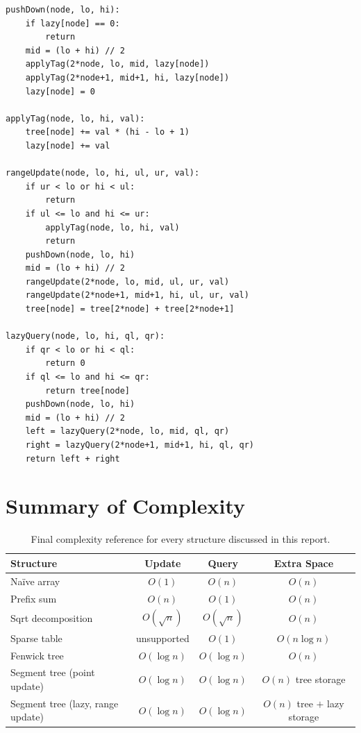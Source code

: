 \documentclass[
  11pt,
  a4paper,
  twoside=false,
  numbers=noenddot,
  headings=big,
  parskip=half,
  toc=bibliography,
  toc=listof,
  bibliography=totoc
]{scrreprt}
\newcommand{\Oh}[1]{O\!\left(#1\right)}
\newcommand{\tblhead}[1]{\textbf{\sffamily #1}}
\begin{document}
\begin{lstlisting}[caption={Lazy-propagation extension for range-add / range-sum (Chapter~\ref{ch:lazy}).}]
pushDown(node, lo, hi):
    if lazy[node] == 0:
        return
    mid = (lo + hi) // 2
    applyTag(2*node, lo, mid, lazy[node])
    applyTag(2*node+1, mid+1, hi, lazy[node])
    lazy[node] = 0

applyTag(node, lo, hi, val):
    tree[node] += val * (hi - lo + 1)
    lazy[node] += val

rangeUpdate(node, lo, hi, ul, ur, val):
    if ur < lo or hi < ul:
        return
    if ul <= lo and hi <= ur:
        applyTag(node, lo, hi, val)
        return
    pushDown(node, lo, hi)
    mid = (lo + hi) // 2
    rangeUpdate(2*node, lo, mid, ul, ur, val)
    rangeUpdate(2*node+1, mid+1, hi, ul, ur, val)
    tree[node] = tree[2*node] + tree[2*node+1]

lazyQuery(node, lo, hi, ql, qr):
    if qr < lo or hi < ql:
        return 0
    if ql <= lo and hi <= qr:
        return tree[node]
    pushDown(node, lo, hi)
    mid = (lo + hi) // 2
    left = lazyQuery(2*node, lo, mid, ql, qr)
    right = lazyQuery(2*node+1, mid+1, hi, ql, qr)
    return left + right
\end{lstlisting}

\chapter{Summary of Complexity}

\begin{table}[H]
\centering
\caption{Final complexity reference for every structure discussed in this report.}
\label{tab:final-complexity}
\begin{tabular}{lccc}
\toprule
\tblhead{Structure} & \tblhead{Update} & \tblhead{Query} & \tblhead{Extra Space} \\
\midrule
Na\"ive array       & $\Oh{1}$       & $\Oh{n}$       & $\Oh{n}$ \\
Prefix sum          & $\Oh{n}$       & $\Oh{1}$       & $\Oh{n}$ \\
Sqrt decomposition   & $\Oh{\sqrt n}$ & $\Oh{\sqrt n}$ & $\Oh{n}$ \\
Sparse table         & unsupported    & $\Oh{1}$       & $\Oh{n\log n}$ \\
Fenwick tree          & $\Oh{\log n}$  & $\Oh{\log n}$  & $\Oh{n}$ \\
\rowcolor{lightblue!30}
Segment tree (point update) & $\Oh{\log n}$ & $\Oh{\log n}$ & $\Oh{n}$ tree storage \\
\rowcolor{lightblue!30}
Segment tree (lazy, range update) & $\Oh{\log n}$ & $\Oh{\log n}$ & $\Oh{n}$ tree $+$ lazy storage \\
\bottomrule
\end{tabular}
\end{table}
\end{document}
